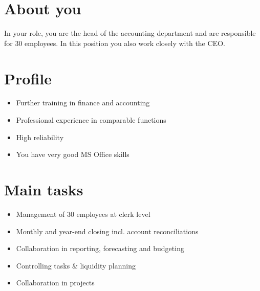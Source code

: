 \section*{About you}
In your role, you are the head of the accounting department and are responsible for 30 employees. 
In this position you also work closely with the CEO.

\section*{Profile}
\begin{itemize}
    \item Further training in finance and accounting
    \item Professional experience in comparable functions
    \item High reliability
    \item You have very good MS Office skills
\end{itemize}

\section*{Main tasks}
\begin{itemize}
    \item Management of 30 employees at clerk level
    \item Monthly and year-end closing incl. account reconciliations
    \item Collaboration in reporting, forecasting and budgeting
    \item Controlling tasks \& liquidity planning
    \item Collaboration in projects
\end{itemize}
